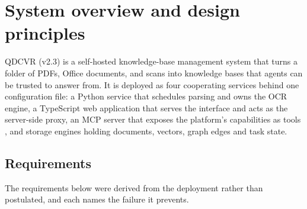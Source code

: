\section{System overview and design principles}
\label{sec:system}

QDCVR (v2.3) is a self-hosted knowledge-base management system that turns a
folder of PDFs, Office documents, and scans into knowledge bases that agents
can be trusted to answer from. It is deployed as four cooperating services
behind one configuration file: a Python service that schedules parsing and
owns the OCR engine, a TypeScript web application that serves the interface
and acts as the server-side proxy, an MCP server that exposes the platform's
capabilities as tools \cite{mcp}, and storage engines holding documents,
vectors, graph edges and task state.

\subsection{Requirements}
\label{sec:req}

The requirements below were derived from the deployment rather than
postulated, and each names the failure it prevents.

